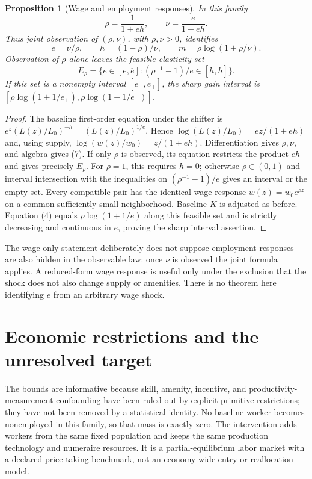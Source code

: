 \documentclass[11pt]{article}
\newtheorem{proposition}[theorem]{Proposition}
\theoremstyle{remark}
\begin{document}
\begin{proposition}[Wage and employment responses]
In this family
\[
 \rho=\frac1{1+eh},\qquad \nu=\frac e{1+eh}.
\]
Thus joint observation of $(\rho,\nu)$, with $\rho,\nu>0$, identifies
\[
 e=\nu/\rho,\qquad h=(1-\rho)/\nu,\qquad
 m=\rho\log(1+\rho/\nu). \tag{7}
\]
Observation of $\rho$ alone leaves the feasible elasticity set
\[
 E_\rho=\{e\in[\underline e,\overline e]:
       (\rho^{-1}-1)/e\in[\underline h,\overline h]\}.
\]
If this set is a nonempty interval $[e_-,e_+]$, the sharp gain interval is
$[\rho\log(1+1/e_+),\rho\log(1+1/e_-)]$.
\end{proposition}
\begin{proof}
The baseline first-order equation under the shifter is
$e^z(L(z)/L_0)^{-h}=(L(z)/L_0)^{1/e}$.
Hence $\log(L(z)/L_0)=ez/(1+eh)$ and, using supply,
$\log(w(z)/w_0)=z/(1+eh)$. Differentiation gives $\rho,\nu$, and
algebra gives (7). If only $\rho$ is observed, its equation restricts
the product $eh$ and gives precisely $E_\rho$. For $\rho=1$, this
requires $h=0$; otherwise $\rho\in(0,1)$ and interval intersection
with the inequalities on $(\rho^{-1}-1)/e$ gives an interval or the
empty set. Every compatible pair has the identical wage response
$w(z)=w_0e^{\rho z}$ on a common sufficiently small neighborhood.
Baseline $K$ is adjusted as before. Equation (4) equals
$\rho\log(1+1/e)$ along this feasible set and is strictly decreasing
and continuous in $e$, proving the sharp interval assertion.
\end{proof}

The wage-only statement deliberately does not suppose employment responses
are also hidden in the observable law: once $\nu$ is observed the joint
formula applies. A reduced-form wage response is useful only under the
exclusion that the shock does not also change supply or amenities. There
is no theorem here identifying $e$ from an arbitrary wage shock.

\section{Economic restrictions and the unresolved target}
The bounds are informative because skill, amenity, incentive, and
productivity-measurement confounding have been ruled out by explicit
primitive restrictions; they have not been removed by a statistical
identity. No baseline worker becomes nonemployed in this family, so that
mass is exactly zero. The intervention adds workers from the same fixed
population and keeps the same production technology and numeraire
resources. It is a partial-equilibrium labor market with a declared
price-taking benchmark, not an economy-wide entry or reallocation model.
\end{document}
